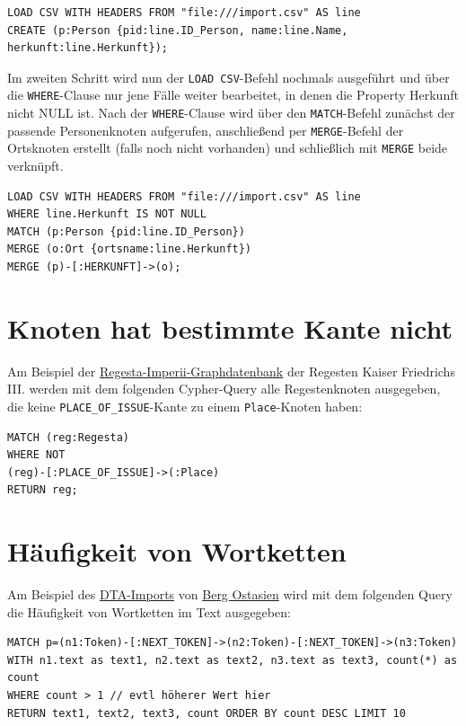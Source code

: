 \documentclass[ngerman,]{scrreprt}
\begin{document}
\begin{verbatim}
LOAD CSV WITH HEADERS FROM "file:///import.csv" AS line
CREATE (p:Person {pid:line.ID_Person, name:line.Name, herkunft:line.Herkunft});
\end{verbatim}

Im zweiten Schritt wird nun der \texttt{LOAD\ CSV}-Befehl nochmals ausgeführt und über die \texttt{WHERE}-Clause nur jene Fälle weiter bearbeitet, in denen die Property Herkunft nicht NULL ist. Nach der \texttt{WHERE}-Clause wird über den \texttt{MATCH}-Befehl zunächst der passende Personenknoten aufgerufen, anschließend per \texttt{MERGE}-Befehl der Ortsknoten erstellt (falls noch nicht vorhanden) und schließlich mit \texttt{MERGE} beide verknüpft.

\begin{verbatim}
LOAD CSV WITH HEADERS FROM "file:///import.csv" AS line
WHERE line.Herkunft IS NOT NULL
MATCH (p:Person {pid:line.ID_Person})
MERGE (o:Ort {ortsname:line.Herkunft})
MERGE (p)-[:HERKUNFT]->(o);
\end{verbatim}

\section{Knoten hat bestimmte Kante nicht}\label{knoten-hat-bestimmte-kante-nicht}

Am Beispiel der \href{http://134.176.70.65:10210/browser/}{Regesta-Imperii-Graphdatenbank} der Regesten Kaiser Friedrichs III. werden mit dem folgenden Cypher-Query alle Regestenknoten ausgegeben, die keine \texttt{PLACE\_OF\_ISSUE}-Kante zu einem \texttt{Place}-Knoten haben:

\begin{verbatim}
MATCH (reg:Regesta)
WHERE NOT
(reg)-[:PLACE_OF_ISSUE]->(:Place)
RETURN reg;
\end{verbatim}

\section{Häufigkeit von Wortketten}\label{huxe4ufigkeit-von-wortketten}

Am Beispiel des \href{http://134.176.70.65:10220/browser/}{DTA-Imports} von \href{http://www.deutschestextarchiv.de/book/show/berg_ostasien01_1864}{Berg Ostasien} wird mit dem folgenden Query die Häufigkeit von Wortketten im Text ausgegeben:

\begin{verbatim}
MATCH p=(n1:Token)-[:NEXT_TOKEN]->(n2:Token)-[:NEXT_TOKEN]->(n3:Token)
WITH n1.text as text1, n2.text as text2, n3.text as text3, count(*) as count
WHERE count > 1 // evtl höherer Wert hier
RETURN text1, text2, text3, count ORDER BY count DESC LIMIT 10
\end{verbatim}
\end{document}
